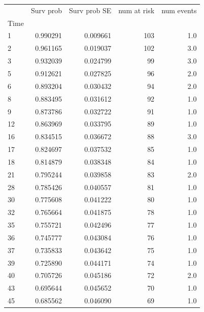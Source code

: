 \documentclass[
  12pt,
  letterpaper,
  DIV=11,
  numbers=noendperiod,
  onepage,
  openany]{scrreprt}
\begin{document}
\begin{tabular}{lrrrr}
\toprule
{} &  Surv prob &  Surv prob SE &  num at risk &  num events \\
Time &            &               &              &             \\
\midrule
1    &   0.990291 &      0.009661 &          103 &         1.0 \\
2    &   0.961165 &      0.019037 &          102 &         3.0 \\
3    &   0.932039 &      0.024799 &           99 &         3.0 \\
5    &   0.912621 &      0.027825 &           96 &         2.0 \\
6    &   0.893204 &      0.030432 &           94 &         2.0 \\
8    &   0.883495 &      0.031612 &           92 &         1.0 \\
9    &   0.873786 &      0.032722 &           91 &         1.0 \\
12   &   0.863969 &      0.033795 &           89 &         1.0 \\
16   &   0.834515 &      0.036672 &           88 &         3.0 \\
17   &   0.824697 &      0.037532 &           85 &         1.0 \\
18   &   0.814879 &      0.038348 &           84 &         1.0 \\
21   &   0.795244 &      0.039858 &           83 &         2.0 \\
28   &   0.785426 &      0.040557 &           81 &         1.0 \\
30   &   0.775608 &      0.041222 &           80 &         1.0 \\
32   &   0.765664 &      0.041875 &           78 &         1.0 \\
35   &   0.755721 &      0.042496 &           77 &         1.0 \\
36   &   0.745777 &      0.043084 &           76 &         1.0 \\
37   &   0.735833 &      0.043642 &           75 &         1.0 \\
39   &   0.725890 &      0.044171 &           74 &         1.0 \\
40   &   0.705726 &      0.045186 &           72 &         2.0 \\
43   &   0.695644 &      0.045652 &           70 &         1.0 \\
45   &   0.685562 &      0.046090 &           69 &         1.0 \\

\end{tabular}
\end{document}
